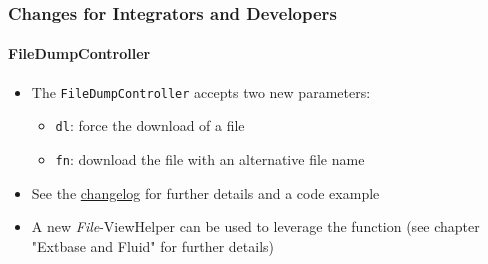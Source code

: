 %

\begin{frame}[fragile]
	\frametitle{Changes for Integrators and Developers}
	\framesubtitle{FileDumpController}

	\begin{itemize}
		\item The \texttt{FileDumpController} accepts two new parameters:
			\begin{itemize}
				\item \texttt{dl}: force the download of a file
				\item \texttt{fn}: download the file with an alternative file name
			\end{itemize}
		\item See the
			\href{https://docs.typo3.org/c/typo3/cms-core/master/en-us/Changelog/11.3/Feature-92518-DownloadAndFilenameOptionsAddedToFileDumpController.html}{changelog}
			for further details and a code example
		\item A new \textit{File}-ViewHelper can be used to leverage the function\newline
			\small(see chapter "Extbase and Fluid" for further details)\normalsize

	\end{itemize}

\end{frame}

